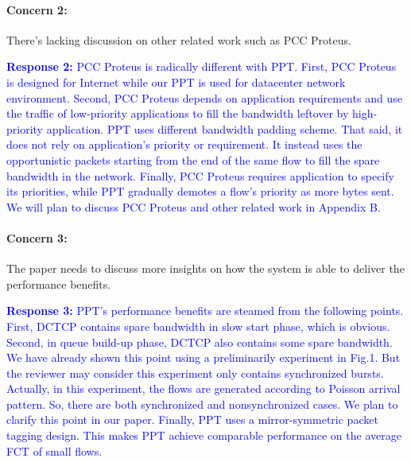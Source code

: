 \documentclass[12pt,one-column]{article}
\begin{document}
{\it \paragraph{Concern 2:} There's lacking discussion on other related work such as PCC Proteus.}

\noindent\textcolor{blue}{\textbf{Response 2:} PCC Proteus is radically different with PPT.
First, PCC Proteus is designed for Internet while our PPT is used for datacenter network environment.
Second, PCC Proteus depends on application requirements and use the traffic of low-priority applications to fill the bandwidth leftover by high-priority application. PPT uses different bandwidth padding scheme. That said, it does not rely on application's priority or requirement. It instead uses the opportunistic packets starting from the end of the same flow to fill the spare bandwidth in the network.
Finally, PCC Proteus requires application to specify its priorities, while PPT gradually demotes a flow's priority as more bytes sent. We will plan to discuss PCC Proteus and other related work in Appendix B.}







{\it \paragraph{Concern 3:} The paper needs to discuss more insights on how the system is able to deliver the performance benefits.}

\noindent\textcolor{blue}{\textbf{Response 3:} 
PPT's performance benefits are steamed from the following points. First, DCTCP contains spare bandwidth in slow start phase, which is obvious.
Second, in queue build-up phase, DCTCP also contains some spare bandwidth. We have already shown this point using a preliminarily experiment in Fig.1. But the reviewer may consider this experiment only contains synchronized bursts. Actually, in this experiment, the flows are generated according to Poisson arrival  pattern. So, there are both synchronized and nonsynchronized cases. We plan to clarify this point in our paper.
Finally, PPT uses a mirror-symmetric packet tagging design. This makes PPT achieve comparable performance on the average FCT of small flows.
}
\end{document}
